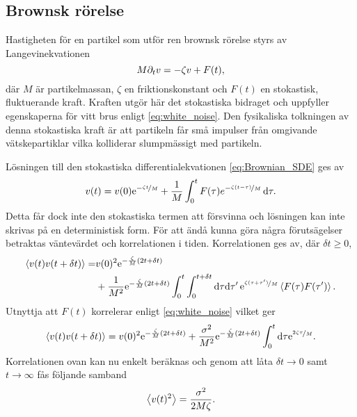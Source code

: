 \subsection{Brownsk rörelse}\label{sec:brown}
\label{brownsk}
Hastigheten för en partikel som utför ren brownsk rörelse styrs av
Langevinekvationen~\cite{Mazo_Brownian2002} 
\begin{equation} \label{eq:Brownian_SDE}
    M\partial_tv=-\zeta v + F(t),
\end{equation}
där $M$ är partikelmassan, $\zeta$ en friktionskonstant och $F(t)$ en
stokastisk, fluktuerande kraft. Kraften utgör här det stokastiska
bidraget och uppfyller egenskaperna för vitt brus enligt \eqref{eq:white_noise}.
Den fysikaliska tolkningen av denna stokastiska kraft är att partikeln
får små impulser från omgivande vätskepartiklar vilka kolliderar
slumpmässigt med partikeln.  

Lösningen till den stokastiska differentialekvationen
\eqref{eq:Brownian_SDE} ges av  
\begin{equation}
v(t)
=v(0)\mathrm{e}^{-\nicefrac{\zeta t}{M}}
 +\frac{1}{M}\int^t_0 F(\tau)e^{-\nicefrac{\zeta (t-\tau)}{M}} \,\mathrm{d}\tau.
\end{equation}
Detta får dock inte den stokastiska termen att försvinna och lösningen kan inte skrivas på en deterministisk form. För att ändå kunna göra några förutsägelser betraktas väntevärdet och korrelationen i tiden. Korrelationen ges av, där $\delta t\geq0$,
\begin{equation}\label{Brownian_korr}
\begin{aligned}
\ev{v(t)v(t+\delta t)} 
=& v(0)^2\ee^{-\frac{\zeta}{M}(2t+\delta t)}\\
 &+ \frac{1}{M^2}\ee^{-\frac{\zeta}{M} (2t+\delta t)}
  \int_0^t\int_0^{t+\delta t}\dd\tau\dd\tau'\, 
     \ee^{\nicefrac{\zeta (\tau+\tau')}{M}}\ev{F(\tau)F(\tau')}.
\end{aligned}
\end{equation}
Utnyttja att $F(t)$ korrelerar enligt \eqref{eq:white_noise} vilket ger 
\begin{equation} \label{eq:Brown_korr}
\ev{v(t)v(t+\delta t)} 
= v(0)^2\ee^{-\frac{\zeta}{M}(2t+\delta t)}
 +\frac{\sigma^2}{M^2}\ee^{-\frac{\zeta}{M} (2t+\delta t)}
  \int_0^t\dd\tau\ee^{\nicefrac{2\zeta \tau}{M}}.
\end{equation}
Korrelationen ovan kan nu enkelt beräknas och genom att låta $\delta t\to 0$ samt $t\to \infty$ fås följande samband
\begin{equation}
    \ev{v(t)^2} = \frac{\sigma^2}{2M\zeta}.
\end{equation}


